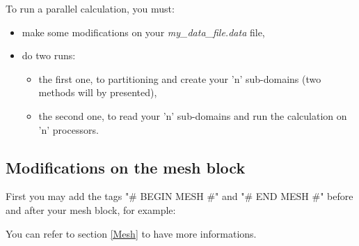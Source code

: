 To run a parallel calculation, you must:
\begin{itemize}
\item make some modifications on your \textit{my\_data\_file.data} file,
\item do two runs:
    \begin{itemize}
    \item the first one, to partitioning and create your 'n' sub-domains (two methods will by presented),
    \item the second one, to read your 'n' sub-domains and run the calculation on 'n' processors.
    \end{itemize}
\end{itemize}

\subsection{Modifications on the mesh block}

First you may add the tags "\# BEGIN MESH \#" and "\# END MESH \#" before and after your mesh block, for example:
\begin{center}
\end{center}
You can refer to section \ref{Mesh} to have more informations.





